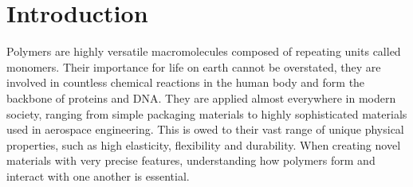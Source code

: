 \documentclass[bachelor,       %
               twoside,        %
               BCOR10mm,       %
                ngerman,english  %
               ]{GAUBM}
\begin{document}
\mainmatter   %

\chapter{Introduction}

Polymers are highly versatile macromolecules composed of repeating units called monomers. Their importance for life on earth cannot be overstated, they are involved in countless chemical reactions in the human body and form the backbone of proteins and DNA. They are applied almost everywhere in modern society, ranging from simple packaging materials to highly sophisticated materials used in aerospace engineering. This is owed to their vast range of unique physical properties, such as high elasticity, flexibility and durability. When creating novel materials with very precise features, understanding how polymers form and interact with one another is essential.\\
\end{document}
